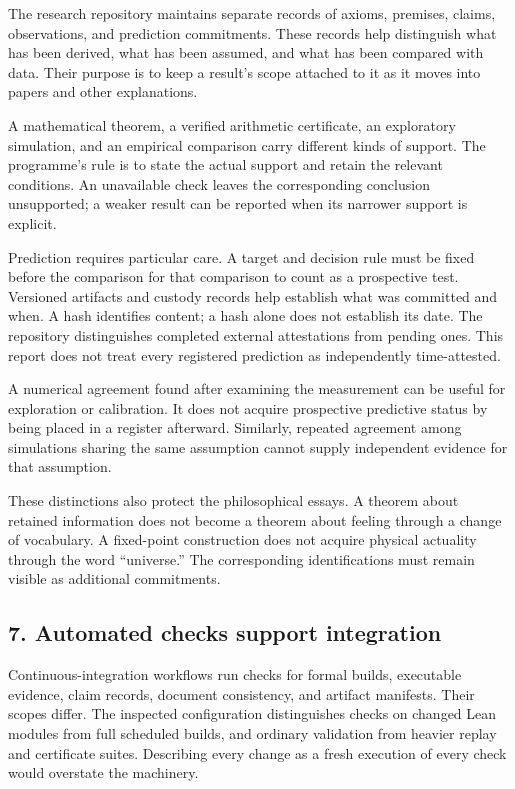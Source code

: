 \documentclass[
  11pt,
]{article}
\begin{document}
The research repository maintains separate records of axioms, premises,
claims, observations, and prediction commitments. These records help
distinguish what has been derived, what has been assumed, and what has
been compared with data. Their purpose is to keep a result's scope
attached to it as it moves into papers and other explanations.

A mathematical theorem, a verified arithmetic certificate, an
exploratory simulation, and an empirical comparison carry different
kinds of support. The programme's rule is to state the actual support
and retain the relevant conditions. An unavailable check leaves the
corresponding conclusion unsupported; a weaker result can be
reported when its narrower support is explicit.

Prediction requires particular care. A target and decision rule must be
fixed before the comparison for that comparison to count as a
prospective test. Versioned artifacts and custody records help establish
what was committed and when. A hash identifies content; a hash alone
does not establish its date. The repository distinguishes completed
external attestations from pending ones. This report does not treat
every registered prediction as independently time-attested.

A numerical agreement found after examining the measurement can be
useful for exploration or calibration. It does not acquire prospective
predictive status by being placed in a register afterward. Similarly,
repeated agreement among simulations sharing the same assumption cannot
supply independent evidence for that assumption.

These distinctions also protect the philosophical essays. A theorem
about retained information does not become a theorem about feeling
through a change of vocabulary. A fixed-point construction does not
acquire physical actuality through the word ``universe.'' The
corresponding identifications must remain visible as additional
commitments.

\subsection{7. Automated checks support
integration}\label{automated-checks-support-integration}

Continuous-integration workflows run checks for formal builds,
executable evidence, claim records, document consistency, and artifact
manifests. Their scopes differ. The inspected configuration
distinguishes checks on changed Lean modules from full scheduled builds,
and ordinary validation from heavier replay and certificate suites.
Describing every change as a fresh execution of every check would
overstate the machinery.
\end{document}
